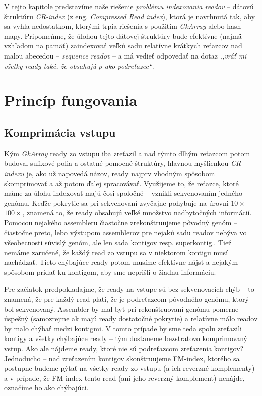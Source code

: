 V tejto kapitole predstavíme naše riešenie \emph{problému indexovania readov} -- dátovú štruktúru \emph{CR-index} (z eng. \emph{Compressed Read index}), ktorá je navrhnutá tak, aby sa vyhla nedostatkom, ktorými trpia riešenia s použitím \emph{GkArray} alebo hash mapy. Pripomeňme, že úlohou tejto dátovej štruktúry bude efektívne (najmä vzhľadom na pamäť) zaindexovať veľkú sadu relatívne krátkych reťazcov nad malou abecedou -- \emph{sequence readov} -- a má vedieť odpovedať na dotaz \emph{,,vráť mi všetky ready také, že obsahujú $p$ ako podreťazec``}.

\section{Princíp fungovania}

\subsection{Komprimácia vstupu}
Kým \emph{GkArray} ready zo vstupu iba zreťazil a nad týmto dlhým reťazcom potom budoval sufixové polia a ostatné pomocné štruktúry, hlavnou myšlienkou \emph{CR-indexu} je, ako už napovedá názov, ready najprv vhodným spôsobom skomprimovať a až potom ďalej spracovávať. Využijeme to, že reťazce, ktoré máme za úlohu indexovať majú čosi spoločné -- vznikli sekvenovaním jedného genómu. Keďže pokrytie sa pri sekvenovaní zvyčajne pohybuje na úrovni $10\times$ -- $100\times$, znamená to, že ready obsahujú veľké množstvo nadbytočných informácií. Pomocou nejakého assembleru čiastočne zrekonštruujeme pôvodný genóm  -- čiastočne preto, lebo výstupom assemblerov pre nejakú sadu readov nebýva vo všeobecnosti súvislý genóm, ale len sada kontigov resp. superkontig.. Tiež nemáme zaručené, že každý read zo vstupu sa v niektorom kontigu musí nachádzať. Tieto chýbajúce ready potom musíme efektívne nájsť a nejakým spôsobom pridať ku kontigom, aby sme neprišli o žiadnu informáciu.

Pre začiatok predpokladajme, že ready na vstupe sú bez sekvenovacích chýb -- to znamená, že pre každý read platí, že je podreťazcom pôvodného genómu, ktorý bol sekvenovaný. Assembler by mal byť pri rekonštruovaní genómu pomerne úspešný (samozrejme ak majú ready dostatočné pokrytie) a relatívne málo readov by malo chýbať medzi kontigmi. V tomto prípade by sme teda spolu zreťazili kontigy a všetky chýbajúce ready -- tým dostaneme bezstratovo komprimovaný vstup. Ako ale nájdeme ready, ktoré nie sú podreťazcom zreťazenia kontigov? Jednoducho -- nad zreťazením kontigov skonštruujeme FM-index, ktorého sa postupne budeme pýtať na všetky ready zo vstupu (a ich reverzné komplementy) a v prípade, že FM-index tento read (ani jeho reverzný komplement) nenájde, označíme ho ako chýbajúci.

